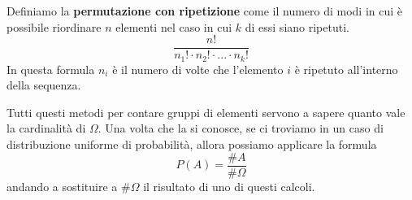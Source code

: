 \begin{definition}
	Definiamo la \textbf{permutazione con ripetizione} come il numero di modi in cui è possibile
	riordinare $n$ elementi nel caso in cui $k$ di essi siano ripetuti.
	\[ \frac{n!}{n_1! \cdot n_2! \cdot ... \cdot n_k!} \]
	In questa formula $n_i$ è il numero di volte che l'elemento $i$ è ripetuto all'interno della
	sequenza.
\end{definition}

Tutti questi metodi per contare gruppi di elementi servono a sapere quanto vale la cardinalità di
$\Omega$. Una volta che la si conosce, se ci troviamo in un caso di distribuzione uniforme di
probabilità, allora possiamo applicare la formula 
\[ P(A) = \frac{\# A}{\# \Omega} \]
andando a sostituire a $\# \Omega$ il risultato di uno di questi calcoli.
